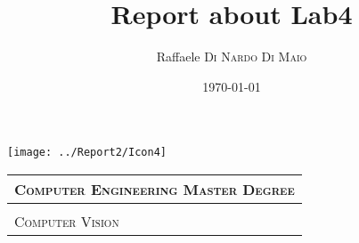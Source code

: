 \documentclass{article}
\title{\textbf{Report about Lab4}} %
\author{Raffaele \textsc{Di Nardo Di Maio}} %
\date{\today} %
\begin{document}
\begin{minipage}{.20\textwidth}
  \texttt{[image: ../Report2/Icon4]}
\end{minipage}\begin{minipage}{.20\textwidth}
  \begin{table}[H]
  \begin{tabular}{l}
  \scshape{\Large{Computer Engineering Master Degree}} \\
  \hline \\
  \scshape{\Large{Computer Vision}} \\
  \end{tabular}
  \end{table}
\end{minipage}
\vspace{1cm}

{\let\newpage\relax\maketitle}
\end{document}
